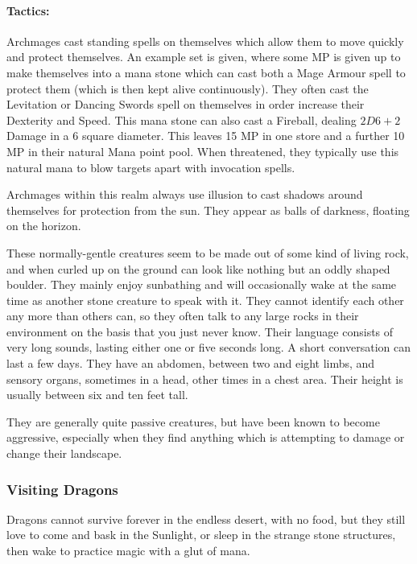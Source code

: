 \begin{multicols}{2}
\paragraph{Tactics:} Archmages cast standing spells on themselves which allow them to move quickly and protect themselves.
An example set is given, where some MP is given up to make themselves into a mana stone which can cast both a Mage Armour spell to protect them (which is then kept alive continuously).
They often cast the Levitation or Dancing Swords spell on themselves in order increase their Dexterity and Speed.
This mana stone can also cast a Fireball, dealing $2D6+2$ Damage in a 6 square diameter.
This leaves 15 MP in one store and a further 10 MP in their natural Mana point pool.
When threatened, they typically use this natural mana to blow targets apart with invocation spells.

Archmages within this realm always use illusion to cast shadows around themselves for protection from the sun.
They appear as balls of darkness, floating on the horizon.


\label{rockman}

These normally-gentle creatures seem to be made out of some kind of living rock, and when curled up on the ground can look like nothing but an oddly shaped boulder.
They mainly enjoy sunbathing and will occasionally wake at the same time as another stone creature to speak with it.
They cannot identify each other any more than others can, so they often talk to any large rocks in their environment on the basis that you just never know.
Their language consists of very long sounds, lasting either one or five seconds long.
A short conversation can last a few days.
They have an abdomen, between two and eight limbs, and sensory organs, sometimes in a head, other times in a chest area.
Their height is usually between six and ten feet tall.

They are generally quite passive creatures, but have been known to become aggressive, especially when they find anything which is attempting to damage or change their landscape.


\subsubsection{Visiting Dragons}

Dragons cannot survive forever in the endless desert, with no food, but they still love to come and bask in the Sunlight, or sleep in the strange stone structures, then wake to practice magic with a glut of mana.


\end{multicols}
